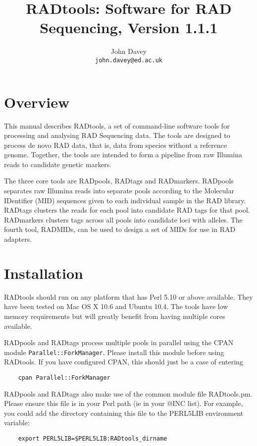 \documentclass[a4paper]{article}
\title{RADtools: Software for RAD Sequencing, Version 1.1.1}
\author{John Davey\\{\tt john.davey@ed.ac.uk}}
\begin{document}
\maketitle

\section{Overview}

This manual describes RADtools, a set of command-line software tools for processing and analysing RAD Sequencing data. The tools are designed to process de novo RAD data, that is, data from species without a reference genome. Together, the tools are intended to form a pipeline from raw Illumina reads to candidate genetic markers.

The three core tools are RADpools, RADtags and RADmarkers. RADpools separates raw Illumina reads into separate pools according to the Molecular IDentifier (MID) sequences given to each individual sample in the RAD library. RADtags clusters the reads for each pool into candidate RAD tags for that pool. RADmarkers clusters tags across all pools into candidate loci with alleles. The fourth tool, RADMIDs, can be used to design a set of MIDs for use in RAD adapters.


\section{Installation}

RADtools should run on any platform that has Perl 5.10 or above available. They have been tested on Mac OS X 10.6 and Ubuntu 10.4. The tools have low memory requirements but will greatly benefit from having multiple cores available.

RADpools and RADtags process multiple pools in parallel using the CPAN module \verb|Parallel::ForkManager|. Please install this module before using RADtools. If you have configured CPAN, this should just be a case of entering

\begin{verbatim}
    cpan Parallel::ForkManager
\end{verbatim}

RADpools and RADtags also make use of the common module file RADtools.pm. Please ensure this file is in your Perl path (ie in your @INC list). For example, you could add the directory containing this file to the PERL5LIB environment variable:

\begin{verbatim}
    export PERL5LIB=$PERL5LIB:RADtools_dirname
\end{verbatim}
\end{document}
